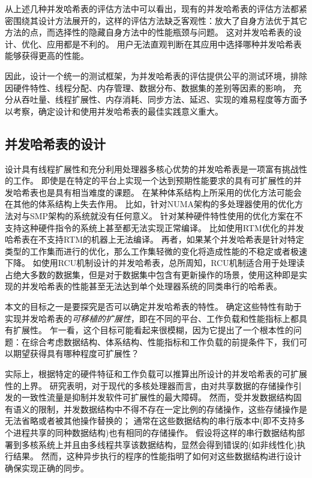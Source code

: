 从上述几种并发哈希表的评估方法中可以看出，现有的并发哈希表的评估方法都紧密围绕其设计方法展开的，这样的评估方法缺乏客观性：放大了自身方法优于其它方法的点，而选择性的隐藏自身方法中的性能瓶颈与问题。
这对并发哈希表的设计、优化、应用都是不利的。
用户无法直观判断在其应用中选择哪种并发哈希表能够获得更高的性能。

因此，设计一个统一的测试框架，为并发哈希表的评估提供公平的测试环境，排除因硬件特性、线程分配、内存管理、数据分布、数据集的差别等因素的影响，
充分从吞吐量、线程扩展性、内存消耗、同步方法、延迟、实现的难易程度等方面予以考察，确定设计和使用并发哈希表的最佳实践意义重大。

\subsection{并发哈希表的设计}
设计具有线程扩展性和充分利用处理器多核心优势的并发哈希表是一项富有挑战性的工作\cite{}。
即使是在特定的平台上实现一个达到预期性能要求的具有可扩展性的并发哈希表也是具有相当难度的课题。
在某种体系结构上所采用的优化方法可能会在其他的体系结构上失去作用\cite{}。
比如，针对NUMA架构的多处理器使用的优化方法对与SMP架构的系统就没有任何意义\cite{}。
针对某种硬件特性使用的优化方案在不支持这种硬件指令的系统上甚至都无法实现正常编译。
比如使用RTM优化的并发哈希表在不支持RTM的机器上无法编译\cite{}。
再者，如果某个并发哈希表是针对特定类型的工作集而进行的优化，那么工作集轻微的变化将造成性能的不稳定或者极速下降。
如使用RCU机制设计的并发哈希表，总所周知，RCU机制适合用于处理读占绝大多数的数据集，但是对于数据集中包含有更新操作的场景，使用这种即是实现的并发哈希表的性能甚至无法达到单个处理器系统的同类串行的哈希表\cite{urcu}。

本文的目标之一是要探究是否可以确定并发哈希表的特性。
确定这些特性有助于实现并发哈希表的\textit{可移植的扩展性}，即在不同的平台、工作负载和性能指标上都具有扩展性。
乍一看，这个目标可能看起来很模糊，因为它提出了一个根本性的问题：在综合考虑数据结构、体系结构、性能指标和工作负载的前提条件下，我们可以期望获得具有哪种程度可扩展性？

实际上，根据特定的硬件特征和工作负载可以推算出所设计的并发哈希表的可扩展性的上界。
研究表明，对于现代的多核处理器而言，由对共享数据的存储操作引发的一致性流量是抑制并发软件可扩展性的最大障碍。
然而，受并发数据结构固有语义的限制，并发数据结构中不得不存在一定比例的存储操作，这些存储操作是无法省略或者被其他操作替换的；
通常在这些数据结构的串行版本中(即不支持多个进程共享的同种数据结构)也有相同的存储操作。
假设将这样的串行数据结构部署到多核系统上并且由多线程共享该数据结构，显然会得到错误的(如非线性化\cite{herlihy1990linearizability})执行结果。
然而，这种异步执行的程序的性能指明了如何对这些数据结构进行设计确保实现正确的同步。

